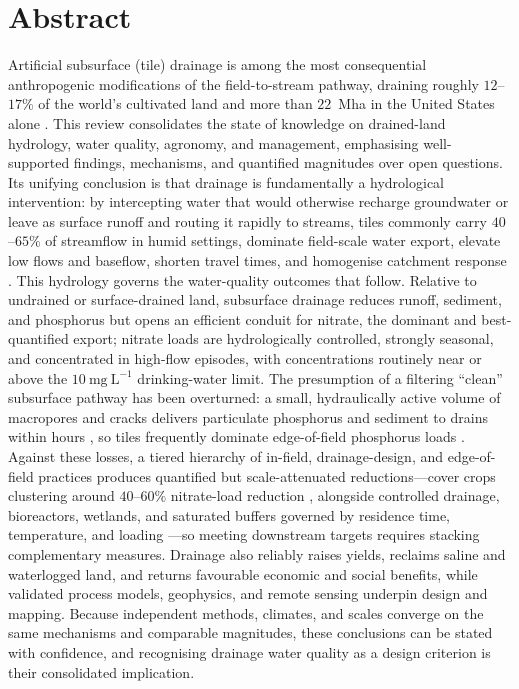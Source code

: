 \section{Abstract}

Artificial subsurface (tile) drainage is among the most consequential
anthropogenic modifications of the field-to-stream pathway, draining roughly
$12$--$17\%$ of the world's cultivated land and more than $22$~Mha in the
United States alone \parencite{Valipour2014,Valayamkunnath2020}. This review consolidates the state of knowledge on
drained-land hydrology, water quality, agronomy, and management, emphasising
well-supported findings, mechanisms, and quantified magnitudes over open
questions. Its unifying conclusion is that drainage is fundamentally a
hydrological intervention: by intercepting water that would otherwise recharge
groundwater or leave as surface runoff and routing it rapidly to streams, tiles
commonly carry $40$--$65\%$ of streamflow in humid settings, dominate field-scale
water export, elevate low flows and baseflow, shorten travel times, and
homogenise catchment response \parencite{King2014,Schilling2019}. This hydrology governs the water-quality
outcomes that follow. Relative to undrained or surface-drained land, subsurface
drainage reduces runoff, sediment, and phosphorus but opens an efficient conduit
for nitrate, the dominant and best-quantified export; nitrate loads are
hydrologically controlled, strongly seasonal, and concentrated in high-flow
episodes, with concentrations routinely near or above the $10~\mathrm{mg~L^{-1}}$
drinking-water limit. The presumption of a filtering ``clean'' subsurface pathway
has been overturned: a small, hydraulically active volume of macropores and
cracks delivers particulate phosphorus and sediment to drains within hours \parencite{Pease2018}, so
tiles frequently dominate edge-of-field phosphorus loads \parencite{Pease2018,Sharpley1995}. Against these losses,
a tiered hierarchy of in-field, drainage-design, and edge-of-field practices
produces quantified but scale-attenuated reductions---cover crops clustering
around $40$--$60\%$ nitrate-load reduction \parencite{Malone2018,Malone2014b,Malone2023}, alongside controlled drainage,
bioreactors, wetlands, and saturated buffers governed by residence time,
temperature, and loading \parencite{Christianson2013,Jaynes2008}---so meeting downstream targets requires stacking
complementary measures. Drainage also reliably raises yields, reclaims saline
and waterlogged land, and returns favourable economic and social benefits, while
validated process models, geophysics, and remote sensing underpin design and
mapping. Because independent methods, climates, and scales converge on the same
mechanisms and comparable magnitudes, these conclusions can be stated with
confidence, and recognising drainage water quality as a design criterion is
their consolidated implication.
